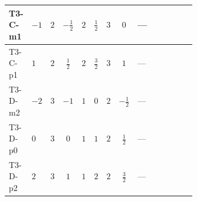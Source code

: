 \documentclass[8pt]{article}
\begin{document}
\begin{landscape}
\begin{longtable}{@{}llcccccc >{\raggedright\arraybackslash}p{0.21\linewidth} >{\raggedright\arraybackslash}p{0.21\linewidth} >{\raggedright\arraybackslash}p{0.21\linewidth}@{}}
\midrule
T3-C-m1 & $-1$ & $2$ & $-\frac{1}{2}$ & $2$ & $\frac{1}{2}$ & $3$ & $0$ & --- & \scriptsize\adjustbox{max width=\linewidth}{$\begin{gathered} -\frac{33}{4} {g_2}^2 \left({y_1}\right)_{ij}\end{gathered}$} & \scriptsize\adjustbox{max width=\linewidth}{$\begin{gathered} -\frac{3}{4} {g_1}^2 \left({y_1}\right)_{ij}\end{gathered}$} \\
\midrule
T3-C-p1 & $1$ & $2$ & $\frac{1}{2}$ & $2$ & $\frac{3}{2}$ & $3$ & $1$ & --- & \scriptsize\adjustbox{max width=\linewidth}{$\begin{gathered} -\frac{33}{4} {g_2}^2 \left({y_1}\right)_{ij}\end{gathered}$} & \scriptsize\adjustbox{max width=\linewidth}{$\begin{gathered} -\frac{15}{4} {g_1}^2 \left({y_1}\right)_{ij}\end{gathered}$} \\
\midrule
T3-D-m2 & $-2$ & $3$ & $-1$ & $1$ & $0$ & $2$ & $-\frac{1}{2}$ & --- & \scriptsize\adjustbox{max width=\linewidth}{$\begin{gathered} -\frac{9}{2} {g_2}^2 \left({y_1}\right)_{ij}\end{gathered}$} & \scriptsize\adjustbox{max width=\linewidth}{$\begin{gathered} -\frac{3}{2} {g_1}^2 \left({y_1}\right)_{ij}\end{gathered}$} \\
\midrule
T3-D-p0 & $0$ & $3$ & $0$ & $1$ & $1$ & $2$ & $\frac{1}{2}$ & --- & \scriptsize\adjustbox{max width=\linewidth}{$\begin{gathered} -\frac{9}{2} {g_2}^2 \left({y_1}\right)_{ij}\end{gathered}$} & \scriptsize\adjustbox{max width=\linewidth}{$\begin{gathered} -\frac{3}{2} {g_1}^2 \left({y_1}\right)_{ij}\end{gathered}$} \\
\midrule
T3-D-p2 & $2$ & $3$ & $1$ & $1$ & $2$ & $2$ & $\frac{3}{2}$ & --- & \scriptsize\adjustbox{max width=\linewidth}{$\begin{gathered} -\frac{9}{2} {g_2}^2 \left({y_1}\right)_{ij}\end{gathered}$} & \scriptsize\adjustbox{max width=\linewidth}{$\begin{gathered} -\frac{15}{2} {g_1}^2 \left({y_1}\right)_{ij}\end{gathered}$} \\

\end{longtable}
\end{landscape}
\end{document}
